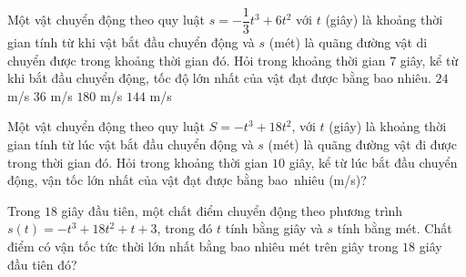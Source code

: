\begin{ex}%
	 Một vật chuyển động theo quy luật $s=-\dfrac{1}{3}t^3+6t^2$ với $t$ (giây) là khoảng thời gian tính từ khi vật bắt đầu chuyển động và $s$ (mét) là quãng đường vật di chuyển được trong khoảng thời gian đó. Hỏi trong khoảng thời gian $7$ giây, kể từ khi bắt đầu chuyển động, tốc độ lớn nhất của vật đạt được bằng bao nhiêu.
	\choice 
		{$24$ m/s} 
		{\True $36$ m/s} 
		{$180$ m/s} 
		{$144$ m/s} 
\end{ex}

\begin{bt}%
	Một vật chuyển động theo quy luật $S=-t^3+18t^2$, với $t$  (giây) là khoảng thời gian tính từ lúc vật bắt đầu chuyển động và $s$ (mét) là quãng đường vật đi được trong thời gian đó. Hỏi trong khoảng thời gian $10$ giây, kể từ lúc bắt đầu chuyển động, vận tốc lớn nhất của vật đạt được bằng bao~nhiêu (m/s)?
\end{bt}

\begin{bt}%
	Trong $18$ giây đầu tiên, một chất điểm chuyển động theo phương trình \xuongdong $s(t)=-t^3+18 t^2+t+3$, trong đó $t$ tính bằng giây và $s$ tính bằng mét. Chất điểm có vận tốc tức thời  lớn nhất bằng bao nhiêu mét trên giây trong $18$ giây đầu tiên đó?
\end{bt}

